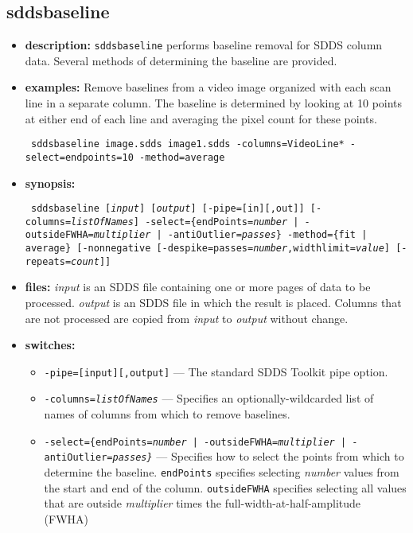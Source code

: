 \begin{latexonly}
\newpage
\end{latexonly}
\subsection{sddsbaseline}
\label{sddsbaseline}

\begin{itemize}
\item {\bf description:}
\verb|sddsbaseline| performs baseline removal for SDDS column data.  Several methods of
determining the baseline are provided.
\item {\bf examples:}
Remove baselines from a video image organized with each scan line in a separate column.
The baseline is determined by looking at 10 points at either end of each line and averaging
the pixel count for these points.
\begin{flushleft}{\tt
sddsbaseline image.sdds image1.sdds -columns=VideoLine* -select=endpoints=10 -method=average 
}\end{flushleft}
\item {\bf synopsis:} 
\begin{flushleft}{\tt
sddsbaseline [{\em input}] [{\em output}] [-pipe=[in][,out]]
[-columns={\em listOfNames}]
-select=\{endPoints={\em number} | -outsideFWHA={\em multiplier} | -antiOutlier={\em passes}\}
-method=\{fit | average\}
[-nonnegative [-despike=passes={\em number},widthlimit={\em value}] [-repeats={\em count}]]
}\end{flushleft}
\item {\bf files:}
{\em input} is an SDDS file containing one or more pages of data to be processed.
{\em output} is an SDDS file in which the result is placed.  Columns that are not
processed are copied from {\em input} to {\em output} without change.
\item {\bf switches:}
    \begin{itemize}
    \item {\tt -pipe=[input][,output]} --- The standard SDDS Toolkit pipe option.
    \item {\tt -columns={\em listOfNames}} --- Specifies an optionally-wildcarded list
        of names of columns from which to remove baselines.
    \item {\tt -select=\{endPoints={\em number} | -outsideFWHA={\em multiplier} | -antiOutlier={\em passes\}}} --- Specifies how to select the points from which to determine the baseline.  \verb|endPoints| specifies selecting {\em number} values from the start and end of the column.  \verb|outsideFWHA| specifies selecting all values that are outside {\em multiplier} times the full-width-at-half-amplitude (FWHA) 

\end{itemize}
\end{itemize}
